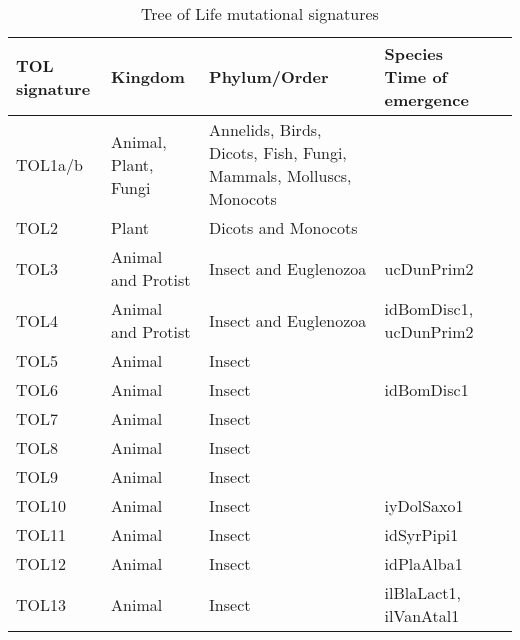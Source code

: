 \begin{table}[h!]
\caption{Tree of Life mutational signatures}
\label{tab:somatic-mutational-signatures}
\begin{adjustbox}{max width=1.1\textwidth,center}
\begin{tabular}{lllll}
\toprule
\textbf{TOL signature} & \textbf{Kingdom} & \textbf{Phylum/Order} & \textbf{Species} \textbf{Time of emergence} \\ \hline
TOL1a/b & Animal, Plant, Fungi & Annelids, Birds, Dicots, Fish, Fungi, Mammals, Molluscs, Monocots & & \\ \hline %
TOL2 & Plant & Dicots and Monocots & & \\ \hline %
TOL3 & Animal and Protist & Insect and Euglenozoa & ucDunPrim2 & \\ \hline %
TOL4 & Animal and Protist & Insect and Euglenozoa & idBomDisc1, ucDunPrim2 & \\ \hline %
TOL5 & Animal & Insect &  & \\ \hline %
TOL6 & Animal & Insect & idBomDisc1 & \\ \hline %
TOL7 & Animal & Insect & & \\ \hline %
TOL8 & Animal & Insect & & \\ \hline %
TOL9 & Animal & Insect & & \\ \hline %
TOL10 & Animal & Insect & iyDolSaxo1 & \\ \hline %
TOL11 & Animal & Insect & idSyrPipi1 & \\ \hline %
TOL12 & Animal & Insect & idPlaAlba1 & \\ \hline %
TOL13 & Animal & Insect & ilBlaLact1, ilVanAtal1 & \\ \hline %

\end{tabular}
\end{adjustbox}
\end{table}
